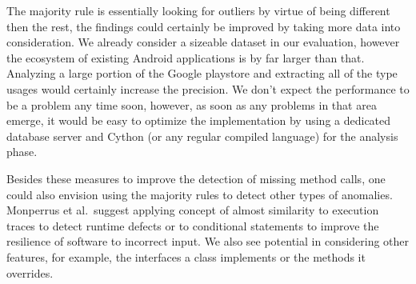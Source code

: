 The majority rule is essentially looking for outliers by virtue of being different then the rest, the findings could certainly be improved by taking more data into consideration.
We already consider a sizeable dataset in our evaluation, however the ecosystem of existing Android applications is by far larger than that.
Analyzing a large portion of the Google playstore and extracting all of the type usages would certainly increase the precision.
We don't expect the performance to be a problem any time soon, however, as soon as any problems in that area emerge, it would be easy to optimize the implementation by using a dedicated database server and Cython (or any regular compiled language) for the analysis phase.

Besides these measures to improve the detection of missing method calls, one could also envision using the majority rules to detect other types of anomalies.
Monperrus et al.\ suggest applying concept of almost similarity to execution traces to detect runtime defects or to conditional statements to improve the resilience of software to incorrect input.
We also see potential in considering other features, for example, the interfaces a class implements or the methods it overrides.


